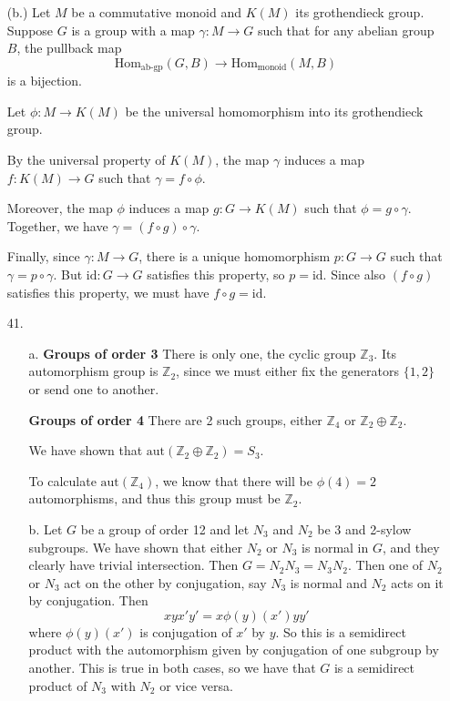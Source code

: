 \documentclass[12pt, reqno]{article}
\theoremstyle{plain}
\theoremstyle{definition}
\theoremstyle{remark}
\newcommand{\ZZ}{\mathbb{Z}}
\begin{document}
\begin{enumerate}
    (b.) Let $M$ be a commutative monoid and $K(M)$ its grothendieck group. Suppose $G$ is a group 
    with a map $\gamma: M \rightarrow G$ such that for any abelian group $B$, the pullback map
    \[
        \text{Hom}_{\text{ab-gp}}(G, B) \rightarrow \text{Hom}_{\text{monoid}}(M, B)
    \]
    is a bijection. 

    Let $\phi: M \rightarrow K(M)$ be the universal homomorphism into its grothendieck group. 

    By the universal property of $K(M)$, the map $\gamma$ induces a map $f: K(M) \rightarrow G$ such that 
    $\gamma = f\circ \phi$. 

    Moreover, the map $\phi$ induces a map $g: G \rightarrow K(M)$ such that $\phi = g \circ \gamma$. 
    Together, we have $\gamma = (f \circ g)\circ \gamma$. 

    Finally, since $\gamma: M \rightarrow G$, there is a unique homomorphism $p: G \rightarrow G$ such 
    that $\gamma = p \circ \gamma$. But $\text{id}: G \rightarrow G$ satisfies this property, so 
    $p = \text{id}$. Since also $(f \circ g)$ satisfies this property, we must have $f \circ g = \text{id}$.

    \item[41.] \begin{enumerate}
        \item[a.] \textbf{Groups of order 3} There is only one, the cyclic group $\ZZ_3$. Its automorphism
        group is $\ZZ_2$, since we must either fix the generators $\{1, 2\}$ or send one to another. 

        \textbf{Groups of order 4} There are 2 such groups, either $\ZZ_4$ or $\ZZ_2 \oplus \ZZ_2$. 

        We have shown that $\text{aut}(\ZZ_2 \oplus \ZZ_2) = S_3$. 

        To calculate $\text{aut}(\ZZ_4)$, we know that there will be $\phi(4) = 2$ automorphisms, and thus 
        this group must be $\ZZ_2$. 

        \item[b.] Let $G$ be a group of order 12 and let $N_3$ and $N_2$ be 3 and 2-sylow subgroups. 
        We have shown that either $N_2$ or $N_3$ is normal in $G$, and they clearly have trivial intersection. 
        Then $G = N_2 N_3 = N_3 N_2$. Then one of $N_2$ or $N_3$ act on the other by conjugation, say $N_3$ is normal
        and $N_2$ acts on it by conjugation. Then 
        \[
            xyx'y' = x\phi(y)(x')yy'
        \]
        where $\phi(y)(x')$ is conjugation of $x'$ by $y$. So this is a semidirect product with the automorphism 
        given by conjugation of one subgroup by another. This is true in both cases, so we have 
        that $G$ is a semidirect product of $N_3$ with $N_2$ or vice versa. 


\end{enumerate}
\end{enumerate}
\end{document}
